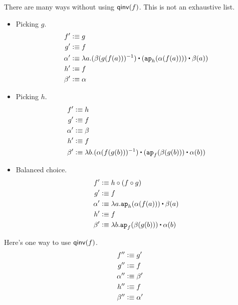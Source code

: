 \documentclass[12pt]{article}
\newcommand{\cut}[1]{}
\newcommand{\marksolution}[1]{\color{FireBrick}#1\normalcolor}%
\newcommand{\marksolution}[1]{\cut{#1}}%
\newenvironment{solution}{\trivlist \item[\hskip \labelsep{\bf
Solution:}]}{\endtrivlist}
\begin{document}
\marksolution{
  \begin{solution}
    There are many ways without using $\mathsf{qinv}(f)$. This is not an exhaustive list.
    \begin{itemize}
      \item Picking $g$.
        \begin{align*}
          f' &\defeq g
          \\
          g' &\defeq f
          \\
          \alpha' &\defeq \lambda a. (\beta(g(f(a)))^{-1}) \concat (\ap_h(\alpha(f(a)))) \concat \beta(a))
          \\
          h' &\defeq f
          \\
          \beta' &\defeq \alpha
        \end{align*}
      \item Picking $h$.
        \begin{align*}
          f' &\defeq h
          \\
          g' &\defeq f
          \\
          \alpha' &\defeq \beta
          \\
          h' &\defeq f
          \\
          \beta' &\defeq \lambda b. (\alpha(f(g(b)))^{-1}) \concat (\ap_f(\beta(g(b))) \concat \alpha(b))
        \end{align*}
      \item Balanced choice.
        \begin{align*}
          f' &\defeq h \comp (f \comp g)
          \\
          g' &\defeq f
          \\
          \alpha' &\defeq \lambda a. \ap_h(\alpha(f(a))) \concat \beta(a)
          \\
          h' &\defeq f
          \\
          \beta' &\defeq \lambda b. \ap_f(\beta(g(b))) \concat \alpha(b)
        \end{align*}
    \end{itemize}
    Here's one way to use $\mathsf{qinv}(f)$.
    \begin{align*}
      f'' &\vcentcolon\equiv g'
      \\
      g'' &\vcentcolon\equiv f
      \\
      \alpha'' &\vcentcolon\equiv \beta'
      \\
      h'' &\vcentcolon\equiv f
      \\
      \beta'' &\vcentcolon\equiv \alpha'
    \end{align*}
  \end{solution}
}
\end{document}

